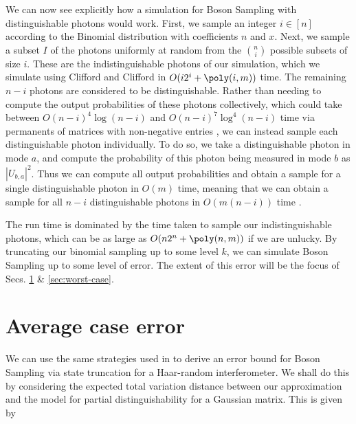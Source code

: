We can now see explicitly how a simulation for Boson Sampling with distinguishable photons would work. 
First, we sample an integer $i \in [n]$ according to the Binomial distribution with coefficients $n$ and $x$. 
Next, we sample a subset $I$ of the photons uniformly at random from the $\binom{n}{i}$ possible subsets of size $i$. 
These are the indistinguishable photons of our simulation, which we simulate using Clifford and Clifford in $O(i2^i + \poly(i,m))$ time. 
The remaining $n-i$ photons are considered to be distinguishable. 
Rather than needing to compute the output probabilities of these photons collectively, which could take between $O(n-i)^4\log(n-i)$ and $O(n-i)^7\log^4(n-i)$ time via permanents of matrices with non-negative entries \cite{huber2008}, we can instead sample each distinguishable photon individually. 
To do so, we take a distinguishable photon in mode $a$, and compute the probability of this photon being measured in mode $b$ as $|U_{b,a}|^2$. 
Thus we can compute all output probabilities and obtain a sample for a single distinguishable photon in $O(m)$ time, meaning that we can obtain a sample for all $n-i$ distinguishable photons in $O(m(n-i))$ time \cite{aaronson2014,neville2017}.

The run time is dominated by the time taken to sample our indistinguishable photons, which can be as large as $O(n2^n + \poly(n,m))$ if we are unlucky. 
By truncating our binomial sampling up to some level $k$, we can simulate Boson Sampling up to some level of error. 
The extent of this error will be the focus of Secs. \ref{sec:average-case} \& \ref{sec:worst-case}.



\section{Average case error}
\label{sec:average-case}

We can use the same strategies used in \cite{renema2018,renema2018loss} to derive an error bound for Boson Sampling via state truncation for a Haar-random interferometer. We shall do this by considering the expected total variation distance between our approximation and the model for partial distinguishability for a Gaussian matrix. This is given by

